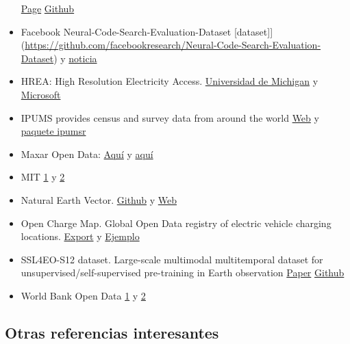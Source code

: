 \documentclass[
]{article}
\begin{document}
\begin{itemize}
  \href{https://earthnets.nicepage.io/}{Page}
  \href{https://github.com/EarthNets}{Github}
\item
  Facebook Neural-Code-Search-Evaluation-Dataset
  {[}dataset{]}{]}(\url{https://github.com/facebookresearch/Neural-Code-Search-Evaluation-Dataset})
  y
  \href{https://venturebeat.com/2019/10/03/facebook-open-sources-data-set-for-code-search-ai-benchmark/}{noticia}
\item
  HREA: High Resolution Electricity Access.
  \href{https://hrea.isr.umich.edu/index.html}{Universidad de Michigan}
  y
  \href{https://planetarycomputer.microsoft.com/dataset/hrea\#overview}{Microsoft}
\item
  IPUMS provides census and survey data from around the world
  \href{https://www.ipums.org/}{Web} y
  \href{https://tech.popdata.org/ipumsr/}{paquete ipumsr}
\item
  Maxar Open Data:
  \href{https://github.com/opengeos/maxar-open-data}{Aquí} y
  \href{https://radiantearth.github.io/stac-browser/\#/external/maxar-opendata.s3.amazonaws.com/events/catalog.json?.language=es}{aquí}
\item
  MIT \href{http://web.mit.edu/towtank/www/vivdr/datasets.html}{1} y
  \href{https://ocw.mit.edu/courses/sloan-school-of-management/15-097-prediction-machine-learning-and-statistics-spring-2012/datasets/}{2}
\item
  Natural Earth Vector.
  \href{https://github.com/nvkelso/natural-earth-vector}{Github} y
  \href{https://www.naturalearthdata.com/}{Web}
\item
  Open Charge Map. Global Open Data registry of electric vehicle
  charging locations.
  \href{https://github.com/openchargemap/ocm-export}{Export} y
  \href{https://tech.marksblogg.com/open-charge-map-global-ev-charging-point-dataset.html}{Ejemplo}
\item
  SSL4EO-S12 dataset. Large-scale multimodal multitemporal dataset for
  unsupervised/self-supervised pre-training in Earth observation
  \href{https://arxiv.org/abs/2211.07044}{Paper}
  \href{https://github.com/zhu-xlab/SSL4EO-S12}{Github}
\item
  World Bank Open Data \href{https://data.worldbank.org/}{1} y
  \href{https://datacatalog.worldbank.org/}{2}
\end{itemize}

\subsection{Otras referencias
interesantes}\label{otras-referencias-interesantes}
\end{document}
